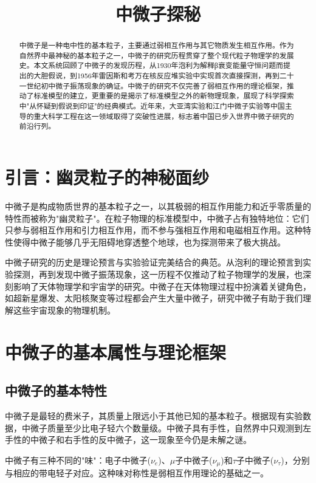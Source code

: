 \documentclass[12pt, a4paper]{article}
\title{中微子探秘}
\begin{document}
\maketitle

\begin{abstract}
中微子是一种电中性的基本粒子，主要通过弱相互作用与其它物质发生相互作用。作为自然界中最神秘的基本粒子之一，中微子的研究历程贯穿了整个现代粒子物理学的发展史。本文系统回顾了中微子的发现历程，从1930年泡利为解释β衰变能量守恒问题而提出的大胆假说，到1956年雷因斯和考万在核反应堆实验中实现首次直接探测，再到二十一世纪初中微子振荡现象的确证。中微子的研究不仅完善了弱相互作用的理论框架，推动了标准模型的建立，更重要的是揭示了标准模型之外的新物理现象，展现了科学探索中"从怀疑到假说到印证"的经典模式。近年来，大亚湾实验和江门中微子实验等中国主导的重大科学工程在这一领域取得了突破性进展，标志着中国已步入世界中微子研究的前沿行列。
\end{abstract}

\section{引言：幽灵粒子的神秘面纱}
中微子是构成物质世界的基本粒子之一，以其极弱的相互作用能力和近乎零质量的特性而被称为"幽灵粒子"。在粒子物理的标准模型中，中微子占有独特地位：它们只参与弱相互作用和引力相互作用，而不参与强相互作用和电磁相互作用。这种特性使得中微子能够几乎无阻碍地穿透整个地球，也为探测带来了极大挑战。

中微子研究的历史是理论预言与实验验证完美结合的典范。从泡利的理论预言到实验探测，再到发现中微子振荡现象，这一历程不仅推动了粒子物理学的发展，也深刻影响了天体物理学和宇宙学的研究。中微子在天体物理过程中扮演着关键角色，如超新星爆发、太阳核聚变等过程都会产生大量中微子，研究中微子有助于我们理解这些宇宙现象的物理机制。

\section{中微子的基本属性与理论框架}
\subsection{中微子的基本特性}
中微子是最轻的费米子，其质量上限远小于其他已知的基本粒子。根据现有实验数据，中微子质量至少比电子轻六个数量级。中微子具有手性，自然界中只观测到左手性的中微子和右手性的反中微子，这一现象至今仍是未解之谜。

中微子有三种不同的"味"：电子中微子($\nu_e$)、$\mu$子中微子($\nu_\mu$)和$\tau$子中微子($\nu_\tau$)，分别与相应的带电轻子对应。这种味对称性是弱相互作用理论的基础之一。
\end{document}
